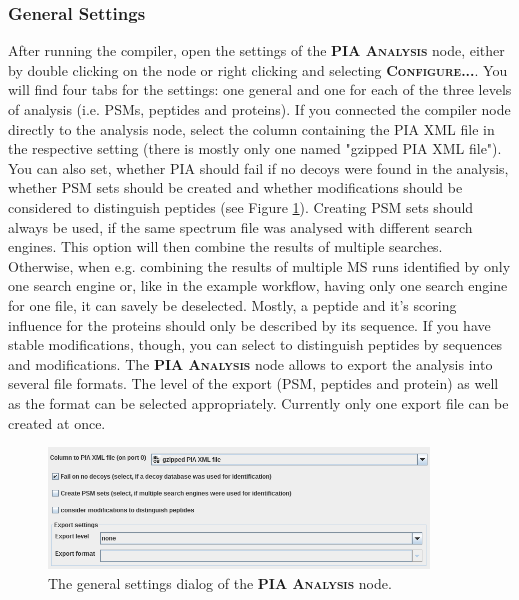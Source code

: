 \documentclass[a4paper,11pt,twoside]{article}
\newcommand{\menu}[1]{{\scshape\bfseries #1}}
\newcommand{\knimenode}[1]{{\scshape\bfseries #1}}
\begin{document}
\subsubsection{General Settings}

After running the compiler, open the settings of the \knimenode{PIA Analysis}
node, either by double clicking on the node or right clicking and selecting
\menu{Configure...}. You will find four tabs for the settings: one general and
one for each of the three levels of analysis (i.e. PSMs, peptides and proteins).
If you connected the compiler node directly to the analysis node, select the
column containing the PIA XML file in the respective setting (there is mostly
only one named "gzipped PIA XML file"). You can also set, whether PIA should
fail if no decoys were found in the analysis, whether PSM sets should be created
and whether modifications should be considered to distinguish peptides (see
Figure \ref{pia_settings_general}). Creating PSM sets should always be used, if
the same spectrum file was analysed with different search engines. This option
will then combine the results of multiple searches. Otherwise, when e.g.
combining the results of multiple MS runs identified by only one search engine
or, like in the example workflow, having only one search engine for one file, it
can savely be deselected. Mostly, a peptide and it's scoring influence for the
proteins should only be described by its sequence. If you have stable
modifications, though, you can select to distinguish peptides by sequences and
modifications. The \knimenode{PIA Analysis} node allows to export the analysis
into several file formats. The level of the export (PSM, peptides and protein)
as well as the format can be selected appropriately. Currently only one export
file can be created at once.

\begin{figure}[ht!]
	\centering
	\includegraphics[width=0.9\textwidth]{graphics/pia_settings_general}
	\caption{The general settings dialog of the \knimenode{PIA Analysis} node.}
	\label{pia_settings_general}
\end{figure}
\end{document}
